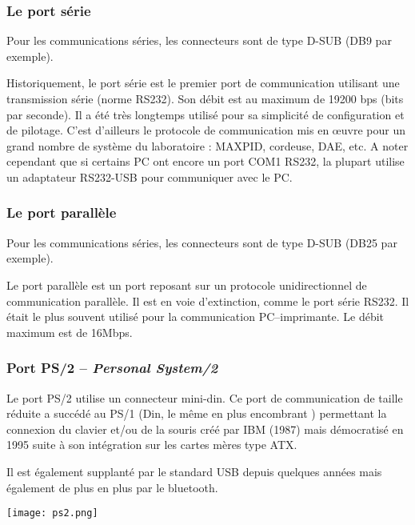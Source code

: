\subsubsection{Le port série}

Pour les communications séries, les connecteurs sont de type D-SUB (DB9 par exemple).

Historiquement, le port série est le premier port de communication utilisant une transmission série (norme RS232). Son débit est au maximum de 19200 bps (bits par seconde). Il a été très longtemps utilisé pour sa simplicité de configuration et de pilotage. C'est d'ailleurs le protocole de communication mis en œuvre pour un grand nombre de système du laboratoire : MAXPID, cordeuse, DAE, etc. A noter cependant que si certains PC ont encore un port COM1 RS232, la plupart utilise un adaptateur RS232-USB pour communiquer avec le PC.

\subsubsection{Le port parallèle}
Pour les communications séries, les connecteurs sont de type D-SUB (DB25 par exemple).

Le port parallèle est un port reposant sur un protocole unidirectionnel de communication parallèle. Il est en voie d'extinction, comme le port série RS232. Il était le plus souvent utilisé pour la communication PC--imprimante. Le débit maximum  est de 16Mbps.


\subsubsection{Port PS/2 -- \textit{Personal System/2}}

\begin{minipage}[c]{.75\linewidth}
Le port PS/2 utilise un connecteur mini-din. 
Ce port de communication de taille réduite a succédé au PS/1 (Din, le même en plus encombrant ) permettant la connexion du clavier et/ou de la souris créé par IBM (1987) mais démocratisé en 1995 suite à son intégration sur les cartes mères type ATX. 

Il est également supplanté par le standard USB depuis quelques années mais également de plus en plus par le bluetooth.
\end{minipage}\hfill
\begin{minipage}[c]{.2\linewidth}
\begin{center}
\texttt{[image: ps2.png]}
\end{center}
\end{minipage}



